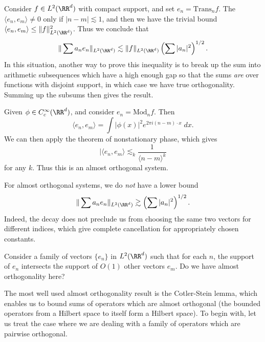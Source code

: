 \begin{example}
  Consider $f \in L^2(\RR^d)$ with compact support, and set $e_n = \text{Trans}_n f$. The $\langle e_n, e_m \rangle \neq 0$ only if $|n - m| \lesssim 1$, and then we have the trivial bound $\langle e_n, e_m \rangle \leq \| f \|_{L^2(\RR^d)}^2$. Thus we conclude that
  \[ \| \sum a_n e_n \|_{L^2(\RR^d)} \lesssim \| f \|_{L^2(\RR^d)} \left( \sum |a_n|^2 \right)^{1/2}. \]
  In this situation, another way to prove this inequality is to break up the sum into arithmetic subsequences which have a high enough gap so that the sums \emph{are} over functions with disjoint support, in which case we have true orthogonality. Summing up the subsums then gives the result.
\end{example}

\begin{example}
  Given $\phi \in C_c^\infty(\RR^d)$, and consider $e_n = \text{Mod}_n f$. Then
  \[ \langle e_n, e_m \rangle = \int |\phi(x)|^2 e^{2 \pi i (n - m) \cdot x}\; dx. \]
  We can then apply the theorem of nonstationary phase, which gives
  \[ |\langle e_n, e_m \rangle \lesssim_k \frac{1}{\langle n - m \rangle^k} \]
  for any $k$. Thus this is an almost orthogonal system.
\end{example}

For almost orthogonal systems, we do \emph{not} have a lower bound
%
\[ \| \sum a_n e_n \|_{L^2(\RR^d)} \gtrsim \left( \sum |a_n|^2 \right)^{1/2}. \]
%
Indeed, the decay does not preclude us from choosing the same two vectors for different indices, which give complete cancellation for appropriately chosen constants.

\begin{example}
  Consider a family of vectors $\{ e_n \}$ in $L^2(\RR^d)$ such that for each $n$, the support of $e_n$ intersects the support of $O(1)$ other vectors $e_m$. Do we have almost orthogonality here?
\end{example}



The most well used almost orthogonality result is the Cotler-Stein lemma, which enables us to bound sums of operators which are almost orthogonal (the bounded operators from a Hilbert space to itself form a Hilbert space). To begin with, let us treat the case where we are dealing with a family of operators which are pairwise orthogonal.

